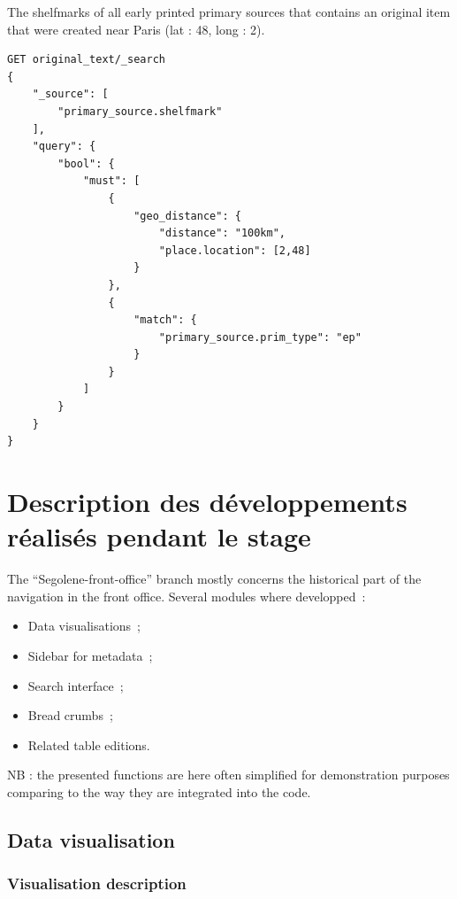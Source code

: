 \documentclass[a4paper,12pt,twoside]{book}
\newcommand{\clearemptydoublepage}{\newpage{\pagestyle{empty}\cleardoublepage}}
\let\quoteOld\quote
\let\endquoteOld\endquote
\renewenvironment{quote}{\small\quoteOld}{\endquoteOld}
\begin{document}
\begin{quote}
	The shelfmarks of all early printed primary sources that contains an original item that were created near Paris (lat : 48, long : 2).
\end{quote}

\begin{lstlisting}
GET original_text/_search
{
    "_source": [
        "primary_source.shelfmark"
    ],
    "query": {
        "bool": {
            "must": [
                {
                    "geo_distance": {
                        "distance": "100km",
                        "place.location": [2,48]
                    }
                },
                {
                    "match": {
                        "primary_source.prim_type": "ep"
                    }
                }
            ]
        }
    }
}
\end{lstlisting}

\clearemptydoublepage

\chapter{\label{Branche}Description des développements réalisés pendant le stage}

The ``Segolene-front-office'' branch mostly concerns the historical part of the navigation in the front office. Several modules where developped~:
\begin{itemize}
	\item Data visualisations~;
	\item Sidebar for metadata~;
	\item Search interface~;
	\item Bread crumbs~;
	\item Related table editions.
\end{itemize}

NB : the presented functions are here often simplified for demonstration purposes comparing to the way they are integrated into the code.

		\section{Data visualisation}\label{data-visualisation}

			\subsection{Visualisation description}\label{visualisation-description}
\end{document}
